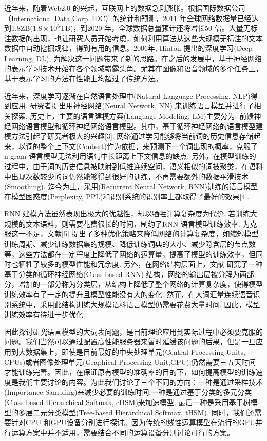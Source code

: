 \documentclass[12pt,a4paper]{article}
\begin{document}
近年来，随着Web2.0 的兴起，互联网上的数据急剧膨胀。根据国际数据公司（International Data Corp.,IDC）的统计和预测，2011 年全球网络数据量已经达到1.8ZB($1.8\times 10^6$TB)，到2020 年，全球数据总量预计还将增长50 倍。大量无标注数据的出现，也让研究人员开始考虑，如何利用算法从这些大规模无标注的文本数据中自动挖掘规律，得到有用的信息。2006年, Hinton 提出的深度学习(Deep Learning, DL)\cite{hinton2006reducing}, 为解决这一问题带来了新的思路。在之后的发展中，基于神经网络的表示学习技术开始在各个领域崭露头角。尤其在图像和语音领域的多个任务上，基于表示学习的方法在性能上均超过了传统方法。

近年来，深度学习逐渐在自然语言处理中(Natural Language Processing, NLP)得到应用. 研究者提出用神经网络(Neural Network, NN) 来训练语言模型并进行了相关探索\cite{DBLP:conf/nips/BengioDV00}. 历史上，主要的语言建模方案(Language Modeling, LM)主要分为: 前馈神经网络语言模型和循环神经网络语言模型。其中，基于循环神经网络的语言模型建模方法引起了研究者极大的兴趣[3]. 网络通过学习能够将当前词的历史信息存储起来，以词的整个上下文(Context)作为依据，来预测下一个词出现的概率，克服了n-gram 语言模型无法利用语句中长距离上下文信息的缺点. 另外，在模型训练的过程中，由于词的历史信息被映射到低维连续空间，语义相似的词被聚类，在语料中出现次数较少的词仍然能够得到很好的训练，不再需要额外的数据平滑技术(Smoothing). 迄今为止，采用(Recurrent Neural Network, RNN)训练的语言模型在模型困惑度(Perplexity, PPL)和识别系统的识别率上都取得了最好的效果[4].

RNN 建模方法虽然表现出极大的优越性，却以牺牲计算复杂度为代价. 若训练大规模的文本语料，则需要花费很长的时间，制约了RNN 语言模型训练效率. 为克服这一不足，文献[5] 提出了多种优化策略来降低网络的计算复杂度，如缩短模型训练周期、减少训练数据集的规模、降低训练词典的大小、减少隐含层的节点数等，这些方法都在一定程度上降低了网络的运算量，提高了模型的训练效率，但同时也牺牲了较多的模型性能和冗余度. 另外，在网络结构层面上，文献\cite{DBLP:journals/coling/BrownPdLM92} 研究了一种基于分类的循环神经网络(Class-based RNN) 结构，网络的输出层被分解为两部分，增加的一部分称为分类层，从结构上降低了整个网络的计算复杂度，使得模型训练效率有了一定的提升且模型性能没有大的变化. 然而，在大词汇量连续语音识别系统中，采用此结构训练大规模语料语言模型仍需要花费大量时间. 因此，模型训练效率有待进一步优化.

因此探讨研究语言模型的大词表问题，是目前理论应用到实际过程中必须要克服的问题。我们当然可以通过配置高性能服务器来暂时延缓该问题的后果，但是一旦应用到大数据集上，即使是目前最好的中央处理单元(Central Processing Units, CPUs)或者图像处理单元(Graphical Processing Unit,GPU),仍然需要三五天时间才能训练完善。因此，在保证原有模型的准确率的目的下，如何提高模型的训练速度是我们主要讨论的内容。为此我们讨论了三个不同的方向：一种是通过采样技术(Importance Sampling)来减少必要的训练时间;一种是通过基于分类的多元分类(Class-based Hierarchical Softmax, cHSM)来加速模型; 最后一种是采用基于树模型的多层二元分类模型(Tree-based Hierarchical Softmax, tHSM). 同时，我们还需要针对CPU 和GPU设备分别进行探讨。因为传统的线性运算模型在流行的GPU并行运算方案中并不适用，需要结合不同的运算设备分别讨论可行的方案。
\end{document}
